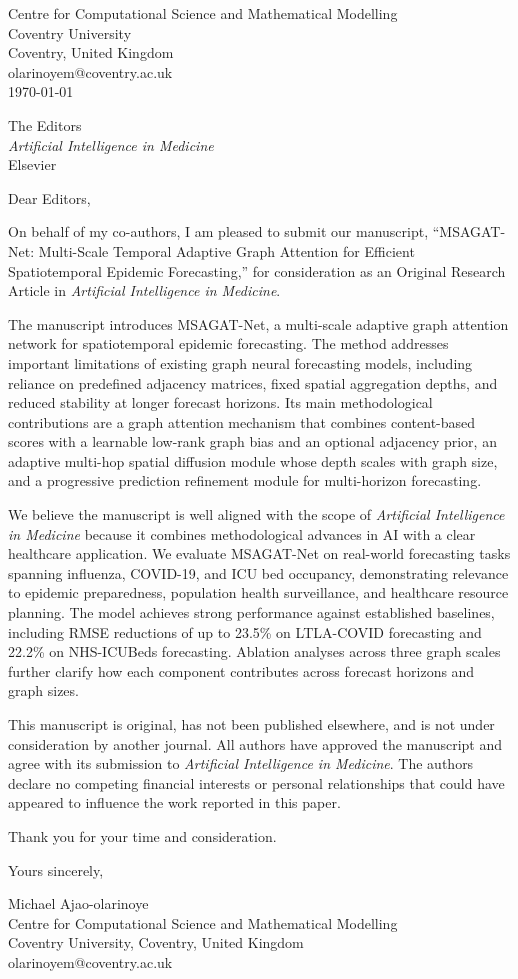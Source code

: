 \documentclass[11pt]{article}
\begin{document}
\begin{flushright}
Centre for Computational Science and Mathematical Modelling\\
Coventry University\\
Coventry, United Kingdom\\
olarinoyem@coventry.ac.uk\\
\today
\end{flushright}

The Editors\\
\textit{Artificial Intelligence in Medicine}\\
Elsevier

Dear Editors,

On behalf of my co-authors, I am pleased to submit our manuscript, ``MSAGAT-Net: Multi-Scale Temporal Adaptive Graph Attention for Efficient Spatiotemporal Epidemic Forecasting,'' for consideration as an Original Research Article in \textit{Artificial Intelligence in Medicine}.

The manuscript introduces MSAGAT-Net, a multi-scale adaptive graph attention network for spatiotemporal epidemic forecasting. The method addresses important limitations of existing graph neural forecasting models, including reliance on predefined adjacency matrices, fixed spatial aggregation depths, and reduced stability at longer forecast horizons. Its main methodological contributions are a graph attention mechanism that combines content-based scores with a learnable low-rank graph bias and an optional adjacency prior, an adaptive multi-hop spatial diffusion module whose depth scales with graph size, and a progressive prediction refinement module for multi-horizon forecasting.

We believe the manuscript is well aligned with the scope of \textit{Artificial Intelligence in Medicine} because it combines methodological advances in AI with a clear healthcare application. We evaluate MSAGAT-Net on real-world forecasting tasks spanning influenza, COVID-19, and ICU bed occupancy, demonstrating relevance to epidemic preparedness, population health surveillance, and healthcare resource planning. The model achieves strong performance against established baselines, including RMSE reductions of up to 23.5\% on LTLA-COVID forecasting and 22.2\% on NHS-ICUBeds forecasting. Ablation analyses across three graph scales further clarify how each component contributes across forecast horizons and graph sizes.

This manuscript is original, has not been published elsewhere, and is not under consideration by another journal. All authors have approved the manuscript and agree with its submission to \textit{Artificial Intelligence in Medicine}. The authors declare no competing financial interests or personal relationships that could have appeared to influence the work reported in this paper.

Thank you for your time and consideration.

\begin{flushright}
Yours sincerely,

\vspace{0.9em}

Michael Ajao-olarinoye\\
Centre for Computational Science and Mathematical Modelling\\
Coventry University, Coventry, United Kingdom\\
olarinoyem@coventry.ac.uk
\end{flushright}
\end{document}
